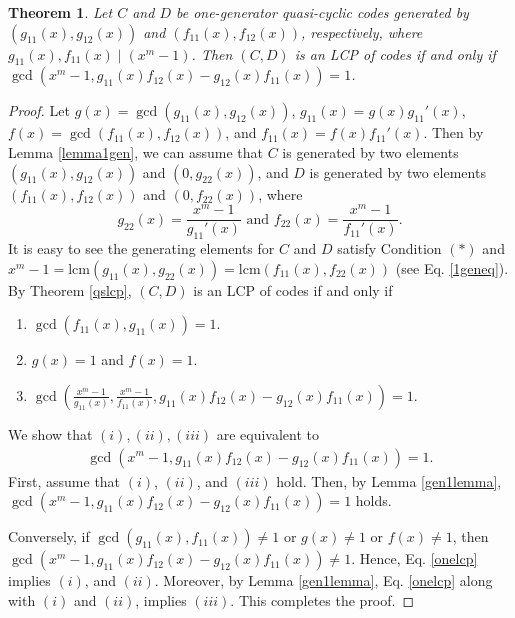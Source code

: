 \documentclass[12 pt]{extarticle}
\numberwithin{equation}{section}
\newtheorem{theorem}{Theorem}[section]
\theoremstyle{definition}
\begin{document}
\begin{theorem}\label{gen1lcp}
Let $C$ and $D$ be one-generator quasi-cyclic codes generated by $(g_{11}(x),g_{12}(x))$ and $(f_{11}(x),f_{12}(x))$, respectively, where $g_{11}(x),f_{11}(x) \mid (x^m-1)$. Then $(C,D)$ is an LCP of codes if and only if $\gcd (x^m-1, g_{11}(x)f_{12}(x)-g_{12}(x)f_{11}(x))=1$.
\end{theorem}
\begin{proof}
Let $g(x)=\gcd(g_{11}(x),g_{12}(x))$, $g_{11}(x)=g(x)g_{11}'(x)$, $f(x)=\gcd(f_{11}(x),f_{12}(x))$, and $f_{11}(x)=f(x)f_{11}'(x)$. 
 Then  by Lemma \ref{lemma1gen}, we can assume that $C$ is generated by two elements $(g_{11}(x),g_{12}(x))$ and $(0,g_{22}(x))$, and $D$ is generated by two elements $(f_{11}(x),f_{12}(x))$ and $(0,f_{22}(x))$, where 
  \begin{equation*}
      g_{22}(x)=\frac{x^m-1}{g_{11}'(x)} \text{ and }
f_{22}(x)=\frac{x^m-1}{f_{11}'(x)}.
\end{equation*} It is easy to see the generating elements for $C$ and $D$ satisfy Condition $(\ast)$ and $x^m-1=\text{lcm}(g_{11}(x),g_{22}(x))=\text{lcm}(f_{11}(x),f_{22}(x))$ (see Eq. \ref{1geneq}). By Theorem \ref{qslcp}, $(C,D)$ is an LCP of codes if and only if 
\begin{enumerate}
       \item[\textit{(i)}] $\gcd(f_{11}(x),g_{11}(x))=1$.
		\item[\textit{(ii)}] $g(x)=1$ and $f(x)=1$.
		\item[\textit{(iii)}] $\gcd\left (\frac{x^m-1}{g_{11}(x)},\frac{x^m-1}{f_{11}(x)}, g_{11}(x)f_{12}(x)-g_{12}(x)f_{11}(x)\right)=1$.
	\end{enumerate}
We show that $(i),(ii),(iii)$ are equivalent to \begin{align}\label{onelcp}
		\gcd (x^m-1, g_{11}(x)f_{12}(x)-g_{12}(x)f_{11}(x))=1.
	\end{align}
 First, assume that $(i)$, $(ii)$, and $(iii)$ hold. Then,  by Lemma \ref{gen1lemma}, $\gcd (x^m-1, g_{11}(x)f_{12}(x)-g_{12}(x)f_{11}(x))=1$ holds. 

Conversely, if $\gcd(g_{11}(x),f_{11}(x))\neq 1$ or $g(x)\neq 1$ or $f(x)\neq 1$, then $\gcd(x^m-1,g_{11}(x)f_{12}(x)-g_{12}(x)f_{11}(x))\neq 1$. Hence, Eq. \ref{onelcp} implies $(i)$, and $(ii)$. Moreover, by Lemma \ref{gen1lemma}, Eq. \ref{onelcp} along with  $(i)$ and $(ii)$, implies $(iii)$.  This completes the proof.
\end{proof}
\end{document}
